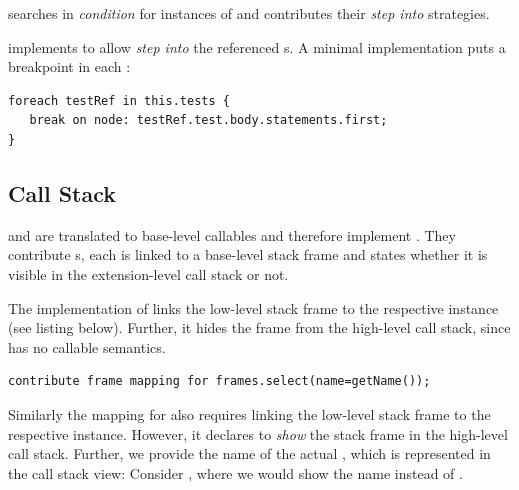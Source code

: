  searches in \emph{condition}
for instances of  and contributes their 
\emph{step into} strategies.

 implements  to allow 
\emph{step into} the referenced s. A  
minimal implementation puts a breakpoint in each :
\begin{lstlisting}[language=debuggerDSL,frame=single]
foreach testRef in this.tests { 
   break on node: testRef.test.body.statements.first;
}
\end{lstlisting}

\subsection{Call Stack}

 and  are translated to 
base-level callables and therefore implement
. They contribute s, 
each is linked to a base-level stack frame and
states whether it is visible in the extension-level call stack or not.

The implementation of   links the
low-level stack frame to the respective instance (see listing below).
Further, it hides the frame from the high-level call stack, since
 has no callable semantics.

\begin{lstlisting}[language=debuggerDSL,frame=single]
contribute frame mapping for frames.select(name=getName());
\end{lstlisting}

Similarly the mapping for  also requires linking the
low-level stack frame to the respective instance. However, 
it declares to \emph{show} the stack frame in the high-level call stack.
Further, we provide the name of the actual , which is represented
in the call stack view: Consider , where we would
show the name  instead of .